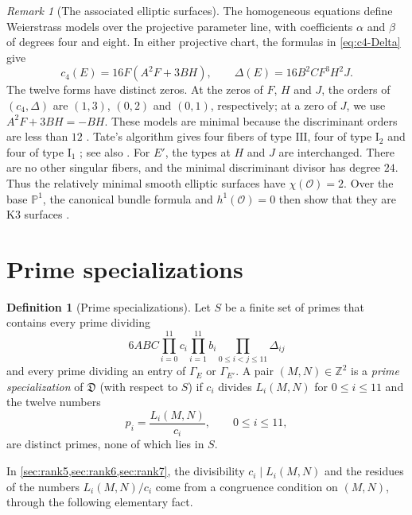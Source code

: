 \documentclass[12pt,oneside,openany]{book}
\theoremstyle{definition}
\theoremstyle{plain}
\numberwithin{equation}{chapter}
\theoremstyle{plain}
\theoremstyle{definition}
\newtheorem{definition}[definition]{Definition}
\theoremstyle{remark}
\newtheorem{remark}[remark]{Remark}
\newcommand{\Z}{\mathbb Z}
\newcommand{\datum}{\mathfrak D}
\begin{document}
\begin{remark}[The associated elliptic surfaces]\label{rem:elliptic-surfaces}
The homogeneous equations define Weierstrass models over the projective parameter line, with coefficients $\alpha$ and $\beta$ of degrees four and eight. In either projective chart, the formulas in \eqref{eq:c4-Delta} give
\[
c_4(E)=16F(A^2F+3BH),\qquad \Delta(E)=16B^2CF^3H^2J.
\]
The twelve forms have distinct zeros. At the zeros of $F$, $H$ and $J$, the orders of $(c_4,\Delta)$ are $(1,3)$, $(0,2)$ and $(0,1)$, respectively; at a zero of $J$, we use $A^2F+3BH=-BH$. These models are minimal because the discriminant orders are less than $12$ \cite[p.~40, Remark~1]{Tate1975}. Tate's algorithm gives four fibers of type $\mathrm{III}$, four of type $\mathrm I_2$ and four of type $\mathrm I_1$ \cite[p.~34]{Tate1975}; see also \cite[\S4.5, Table~1]{SchuttShioda2010}. For $E'$, the types at $H$ and $J$ are interchanged. There are no other singular fibers, and the minimal discriminant divisor has degree $24$. Thus the relatively minimal smooth elliptic surfaces have $\chi(\mathcal O)=2$. Over the base $\mathbb P^1$, the canonical bundle formula and $h^1(\mathcal O)=0$ then show that they are K3 surfaces \cite[Theorems~6.8 and~6.12 and \S8.2]{SchuttShioda2010}.
\end{remark}

\section{Prime specializations}\label{sec:families-prime}

\begin{definition}[Prime specializations]\label{def:prime-specialization}
Let $S$ be a finite set of primes that contains every prime dividing
\begin{equation}\label{eq:S-condition}
6ABC\prod_{i=0}^{11}c_i\prod_{i=1}^{11}b_i\prod_{0\le i<j\le11}\Delta_{ij}
\end{equation}
and every prime dividing an entry of $\Gamma_E$ or $\Gamma_{E'}$. A pair $(M,N)\in\Z^2$ is a \emph{prime specialization} of $\datum$ (with respect to $S$) if $c_i$ divides $L_i(M,N)$ for $0\le i\le11$ and the twelve numbers
\begin{equation}\label{eq:prime-values}
p_i=\frac{L_i(M,N)}{c_i},\qquad0\le i\le11,
\end{equation}
are distinct primes, none of which lies in $S$.
\end{definition}

In \cref{sec:rank5,sec:rank6,sec:rank7}, the divisibility $c_i\mid L_i(M,N)$ and the residues of the numbers $L_i(M,N)/c_i$ come from a congruence condition on $(M,N)$, through the following elementary fact.
\end{document}

